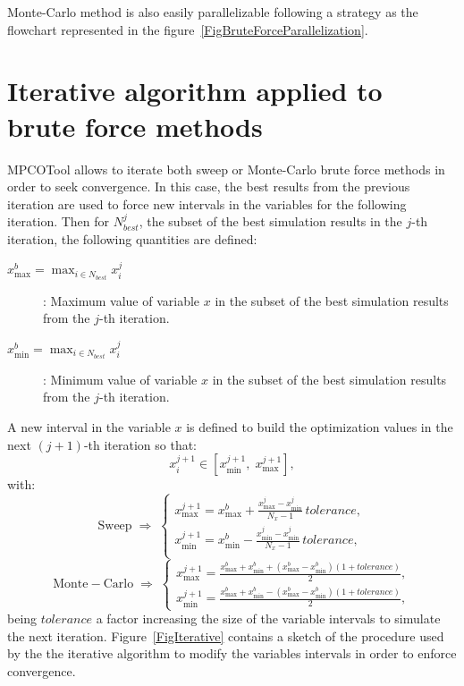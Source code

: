 \documentclass[a4paper]{report}
\newcommand{\EQ}[2]
{\begin{equation}#1\label{#2}\end{equation}}
\begin{document}
Monte-Carlo method is also easily parallelizable following a strategy as the
flowchart represented in the figure~\ref{FigBruteForceParallelization}.

\section{Iterative algorithm applied to brute force methods}

MPCOTool allows to iterate both sweep or Monte-Carlo brute force methods in
order to seek convergence. In this case, the best results from the previous
iteration are used to force new intervals in the variables for the following
iteration. Then for $N_{best}^j$, the subset of the best simulation results in
the $j$-th iteration, the following quantities are defined:
\begin{description}
\item[$\displaystyle x_{\max}^b=\max_{i\in N_{best}}x_i^j$]: Maximum value of
	variable $x$ in the subset of the best simulation results from the $j$-th
	iteration.
\item[$\displaystyle x_{\min}^b=\max_{i\in N_{best}}x_i^j$]: Minimum value of
	variable $x$ in the subset of the best simulation results from the $j$-th
	iteration.
\end{description}
A new interval in the variable $x$ is defined to build the optimization values in the next $(j+1)$-th iteration so that:
\EQ{x_i^{j+1}\in\left[x_{\min}^{j+1},\;x_{\max}^{j+1}\right],}
{EqIterationInterval}
with:
\[
	\mathrm{Sweep}\;\Rightarrow\;\left\{\begin{array}{c}
	\displaystyle
	x_{\max}^{j+1}=x_{\max}^b+\frac{x_{\max}^j-x_{\min}^j}{N_x-1}\,tolerance,\\
	\displaystyle
	x_{\min}^{j+1}=x_{\min}^b-\frac{x_{\min}^j-x_{\min}^j}{N_x-1}\,tolerance,\\
	\end{array}\right.
\]
\EQ
{
	\mathrm{Monte-Carlo}\;\Rightarrow\;\left\{\begin{array}{c}
	\displaystyle x_{\max}^{j+1}=\frac{x_{\max}^b+x_{\min}^b
	+\left(x_{\max}^b-x_{\min}^b\right)(1+tolerance)}{2},\\
	\displaystyle x_{\min}^{j+1}=\frac{x_{\max}^b+x_{\min}^b
	-\left(x_{\max}^b-x_{\min}^b\right)(1+tolerance)}{2},
	\end{array}\right.
}{EqIterationIntervalII}
being $tolerance$ a factor increasing the size of the variable intervals to
simulate the next iteration.
Figure~\ref{FigIterative} contains a sketch of the procedure used by the the iterative algorithm to modify the variables intervals in order to enforce convergence. 
\end{document}
